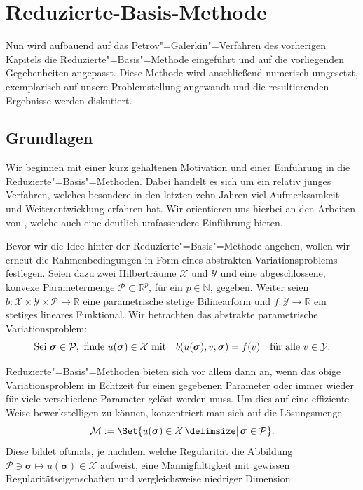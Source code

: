 \documentclass[../main.tex]{subfiles}
\begin{document}
\chapter{Reduzierte-Basis-Methode} %
\label{chapter:rbm}

Nun wird aufbauend auf das Petrov"=Galerkin"=Verfahren des vorherigen Kapitels die Reduzierte"=Basis"=Methode eingeführt und auf die vorliegenden Gegebenheiten angepasst.
Diese Methode wird anschließend numerisch umgesetzt, exemplarisch auf unsere Problemstellung angewandt und die resultierenden Ergebnisse werden diskutiert.

\section{Grundlagen} %
\label{sub:grb:rb:grundlagen}

Wir beginnen mit einer kurz gehaltenen Motivation und einer Einführung in die Reduzierte"=Basis"=Methoden.
Dabei handelt es sich um ein relativ junges Verfahren, welches besondere in den letzten zehn Jahren viel Aufmerksamkeit und Weiterentwicklung erfahren hat.
Wir orientieren uns hierbei an den Arbeiten von \textcite{Rozza2008,Patera:2007un}, welche auch eine deutlich umfassendere Einführung bieten.

Bevor wir die Idee hinter der Reduzierte"=Basis"=Methode angehen, wollen wir erneut die Rahmenbedingungen in Form eines abstrakten Variationsproblems festlegen.
Seien dazu zwei Hilberträume $\mathcal X$ und $\mathcal Y$ und eine abgeschlossene, konvexe Parametermenge $\mathcal P \subset \mathbb{R}^{p}$, für ein $p \in \mathbb{N}$, gegeben.
Weiter seien $b \colon \mathcal X \times \mathcal Y \times \mathcal P \to \mathbb{R}$ eine parametrische stetige Bilinearform und $f \colon \mathcal Y \to \mathbb{R}$ ein stetiges lineares Funktional.
Wir betrachten das abstrakte parametrische Variationsproblem:
\begin{equation}
\label{eq:abstraktes_parametrische_vp}
    \text{Sei } \bm \sigma \in \mathcal P, \text{ finde } u(\bm \sigma) \in \mathcal X \text{ mit} \quad b(u(\bm \sigma), v; \bm \sigma) = f(v) \quad \fa v \in \mathcal Y.
\end{equation}

Reduzierte"=Basis"=Methoden bieten sich vor allem dann an, wenn das obige Variationsproblem in Echtzeit für einen gegebenen Parameter oder immer wieder für viele verschiedene Parameter gelöst werden muss.
Um dies auf eine effiziente Weise bewerkstelligen zu können, konzentriert man sich auf die Lösungsmenge
\begin{equation}
\label{eq:stetige_loesungsmenge}
    \mathcal M := \Set{u(\bm \sigma) \in \mathcal X \given \bm \sigma \in \mathcal P}.
\end{equation}
Diese bildet oftmals, je nachdem welche Regularität die Abbildung $\mathcal P \ni \bm \sigma \mapsto u(\bm \sigma) \in \mathcal X$ aufweist, eine Mannigfaltigkeit mit gewissen Regularitätseigenschaften und vergleichsweise niedriger Dimension.
\end{document}
